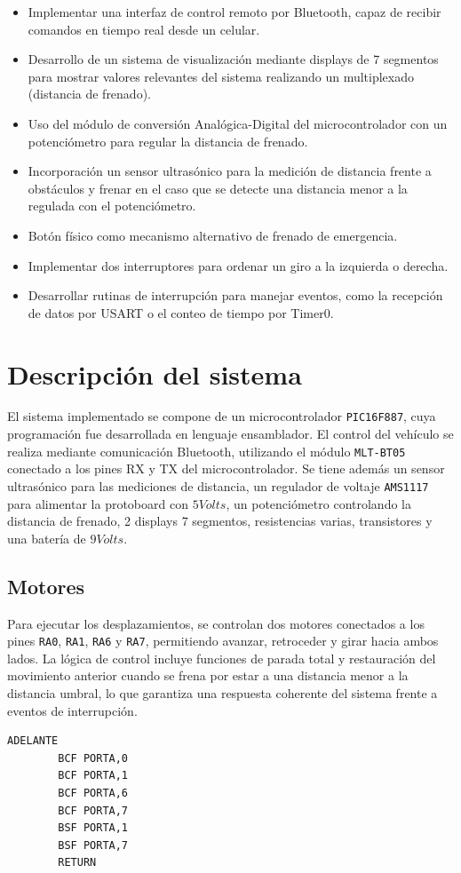 \documentclass[]{article}
\begin{document}
	\begin{itemize}
		\item Implementar una interfaz de control remoto por Bluetooth, capaz de recibir comandos en tiempo real desde un celular.
		\item Desarrollo de un sistema de visualización mediante displays de 7 segmentos para mostrar valores relevantes del sistema realizando un multiplexado (distancia de frenado).
		\item Uso del módulo de conversión Analógica-Digital del microcontrolador con un potenciómetro para regular la distancia de frenado.
		\item Incorporación un sensor ultrasónico para la medición de distancia frente a obstáculos y frenar en el caso que se detecte una distancia menor a la regulada con el potenciómetro.
		\item Botón físico como mecanismo alternativo de frenado de emergencia.
		\item Implementar dos interruptores para ordenar un giro a la izquierda o derecha.
		\item Desarrollar rutinas de interrupción para manejar eventos, como la recepción de datos por USART o el conteo de tiempo por Timer0.
	\end{itemize}
	
	\section{Descripción del sistema}
	
	El sistema implementado se compone de un microcontrolador \texttt{PIC16F887}, cuya programación fue desarrollada en lenguaje ensamblador. El control del vehículo se realiza mediante comunicación Bluetooth, utilizando el módulo \texttt{MLT-BT05} conectado a los pines RX y TX del microcontrolador. Se tiene además un sensor ultrasónico para las mediciones de distancia, un regulador de voltaje \texttt{AMS1117} para alimentar la protoboard con $5 Volts$, un potenciómetro controlando la distancia de frenado, 2 displays 7 segmentos, resistencias varias, transistores y una batería de $9 Volts$.
	
	\subsection{Motores}
	Para ejecutar los desplazamientos, se controlan dos motores conectados a los pines \texttt{RA0}, \texttt{RA1}, \texttt{RA6} y \texttt{RA7}, permitiendo avanzar, retroceder y girar hacia ambos lados. La lógica de control incluye funciones de parada total y restauración del movimiento anterior cuando se frena por estar a una distancia menor a la distancia umbral, lo que garantiza una respuesta coherente del sistema frente a eventos de interrupción.
	\newpage
	\thispagestyle{fancy}
	\begin{lstlisting}[caption={Rutina para movimiento hacia adelante}, label={lst:adelante}]
		ADELANTE
		BCF	PORTA,0
		BCF	PORTA,1
		BCF	PORTA,6
		BCF	PORTA,7
		BSF	PORTA,1
		BSF	PORTA,7
		RETURN
	\end{lstlisting}
	
\end{document}
